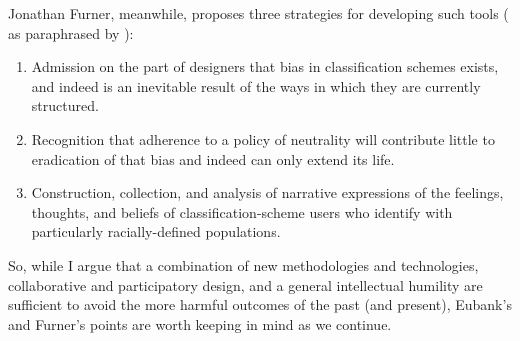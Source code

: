 Jonathan Furner, meanwhile, proposes three strategies for developing such tools (\cite{furner2007dewey} as paraphrased by \cite{nobleAlgorithmsOppressionHow2018}):

\begin{enumerate} \setlength{\itemsep}{0pt} \setlength{\parskip}{0pt} 
	\item{Admission on the part of designers that bias in classification schemes exists, and indeed is an inevitable result of the ways in which they are currently structured.}
	\item{Recognition that adherence to a policy of neutrality will contribute little to eradication of that bias and indeed can only extend its life.}
	\item{Construction, collection, and analysis of narrative expressions of the feelings, thoughts, and beliefs of classification-scheme users who identify with particularly racially-defined populations.}
\end{enumerate}

So, while I argue that a combination of new methodologies and technologies, collaborative and participatory design, and a general intellectual humility are sufficient to avoid the more harmful outcomes of the past (and present), Eubank's and Furner's points are worth keeping in mind as we continue.




%

\subsubsection{} \label{sec:se_critique}

